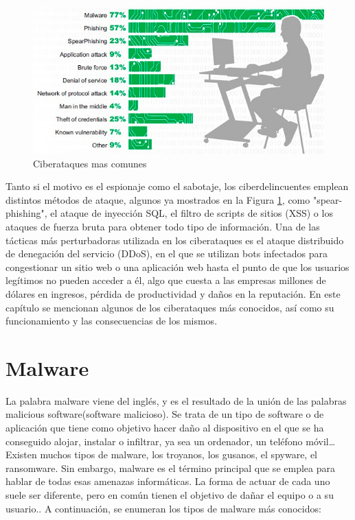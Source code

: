 \begin{figure}[tphb]
  		   \centering
     		   \includegraphics[width=5in]{ciberataques.png}
  		   \caption{Ciberataques mas comunes \cite{ciberataques}}
  		   \label{img:ciberataques}
\end{figure}

Tanto si el motivo es el espionaje como el sabotaje, los ciberdelincuentes emplean distintos métodos de ataque, algunos ya mostrados en la Figura \ref{img:ciberataques}, como "spear-phishing", el ataque de inyección SQL, el filtro de scripts de sitios (XSS) o los ataques de fuerza bruta para obtener todo tipo de información. Una de las tácticas más perturbadoras utilizada en los ciberataques 
es el ataque distribuido de denegación del servicio (DDoS), en el que se utilizan bots infectados para congestionar un sitio web o una aplicación web hasta el punto 
de que los usuarios legítimos no pueden acceder a él, algo que cuesta a las empresas millones de dólares en ingresos, pérdida de productividad y daños en la reputación.\cite{akamai}
En este capítulo se mencionan algunos de los ciberataques más conocidos, así como su funcionamiento y las consecuencias de los mismos.

\section{Malware}
\label{sec:malware}

La palabra malware viene del inglés, y es el resultado de la unión de las palabras malicious software(software malicioso). Se trata de un tipo de software o de aplicación que tiene como objetivo hacer daño al dispositivo en el que se ha conseguido alojar, instalar o infiltrar, ya sea un ordenador, un teléfono móvil… 
Existen muchos tipos de malware, los troyanos, los gusanos, el spyware, el ransomware. Sin embargo, malware es el término principal que se emplea para hablar de todas esas amenazas informáticas. La forma de actuar de cada uno suele ser diferente, pero en común tienen el objetivo de dañar el equipo o a su usuario.\cite{malware}. A continuación, se enumeran los tipos de malware más conocidos: 

